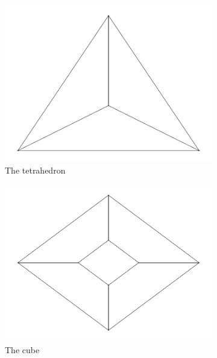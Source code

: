 \documentclass[12pt]{article}
\begin{document}
  \begin{figure}[H]
      \centering 
      \begin{subfigure}[b]{0.3\textwidth}
          \centering 
          \includegraphics[width = \textwidth]{../output/Q1-platonic-4.pdf}
          \caption{The tetrahedron}
      \end{subfigure}
      \hfill
      \begin{subfigure}[b]{0.3\textwidth}
          \centering 
          \includegraphics[width = \textwidth]{../output/Q1-platonic-6.pdf}
          \caption{The cube}
      \end{subfigure}
      \hfill
      \begin{subfigure}[b]{0.3\textwidth}

\end{subfigure}
\end{figure}
\end{document}
